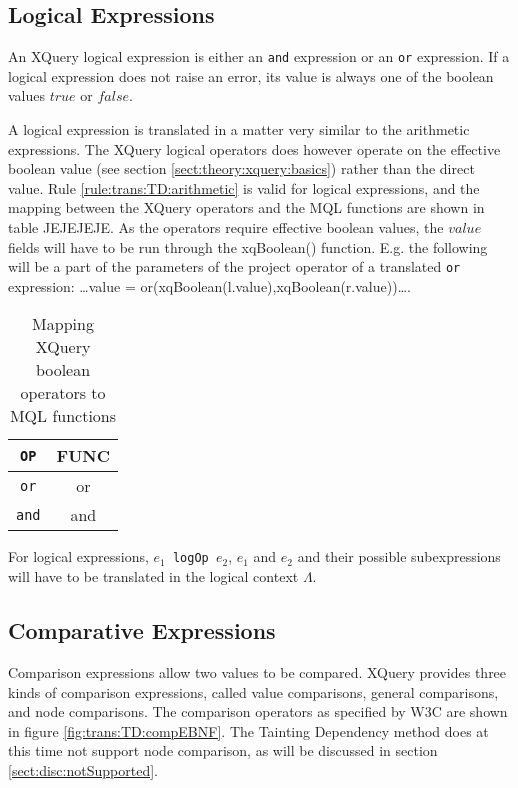 \subsection{Logical Expressions}
\label{sect:trans:TD:logical}
An XQuery logical expression is either an \texttt{and} expression or an \texttt{or} expression. If a logical
expression does not raise an error, its value is always one of the boolean values $true$ or $false$.

A logical expression is translated in a matter very similar to the arithmetic expressions. The XQuery logical
operators does however operate on the effective boolean value (see section \ref{sect:theory:xquery:basics}) rather
than the direct value. Rule \ref{rule:trans:TD:arithmetic} is valid for logical expressions, and the mapping
between the XQuery operators and the MQL functions are shown in table JEJEJEJE. As the operators require effective
boolean values, the $value$ fields will have to be run through the \textsf{xqBoolean()} function. E.g. the
following will be a part of the parameters of the \textsf{project} operator of a translated \texttt{or} expression:
\textsf{\ldots value = or(xqBoolean(l.value),xqBoolean(r.value))\ldots}.

\begin{table}[h]
\centering
\begin{tabular}{c|c}
\texttt{OP} & \textsf{FUNC} \\ \hline
\texttt{or} & \textsf{or} \\
\texttt{and} & \textsf{and} \\
\end{tabular}
\label{tab:trans:TD:logMap}
\caption{Mapping XQuery boolean operators to MQL functions}
\end{table}

For logical expressions, $e_1$\texttt{ logOp }$e_2$, $e_1$ and $e_2$ and their possible subexpressions will have
to be translated in the logical context $\Lambda$.

\subsection{Comparative Expressions}
\label{sect:trans:TD:compArit}
Comparison expressions allow two values to be compared. XQuery provides three kinds of comparison expressions,
called value comparisons, general comparisons, and node comparisons. The comparison operators as specified by W3C
are shown in figure \ref{fig:trans:TD:compEBNF}. The Tainting Dependency method does at this time not support node
comparison, as will be discussed in section \ref{sect:disc:notSupported}.

